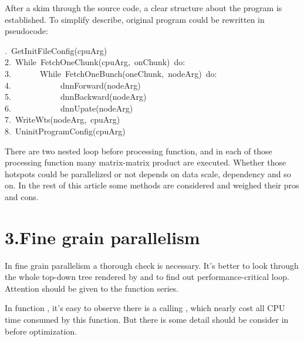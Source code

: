 \documentclass{article}
\begin{document}
After a skim through the source code, a clear structure 
about the program is established. To simplify describe, original program could be rewritten in pseudocode:%
\begin{mdpre}%
.~{GetInitFileConfig}(cpuArg)\\
{2}.~{While}~{FetchOneChunk}(cpuArg,~onChunk)~{do}:\\
{3}.~~~~~~~{While}~{FetchOneBunch}(oneChunk,~nodeArg)~{do}:\\
{4}.~~~~~~~~~~~~dnnForward(nodeArg)\\
{5}.~~~~~~~~~~~~dnnBackward(nodeArg)\\
{6}.~~~~~~~~~~~~dnnUpate(nodeArg)\\
{7}.~{WriteWts}(nodeArg,~cpuArg)\\
{8}.~{UninitProgramConfig}(cpuArg)\\
\end{mdpre}\noindent{}There are two nested loop before  processing function, and 
in each of those processing function many matrix-matrix product are
executed. Whether those hotspots could be parallelized or not depends
on data scale, dependency and so on. In the rest of this article some
methods are considered and weighed their pros and cons.

\section{3.\hspace*{0.5em}Fine grain parallelism}\label{sec-fine-grain-parallelism}%

\noindent{}In fine grain parallelism a thorough check is necessary. It's better to look through the whole top-down tree rendered by  and to find out performance-critical loop. Attention should be given to the  function series.%

In function , it's easy to observe there is a  calling , which nearly cost all CPU time consumed by this function. But there is some detail should be consider in before optimization.%
\end{document}
